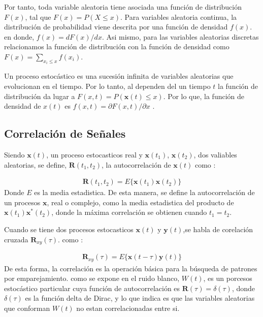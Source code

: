 Por tanto, toda variable aleatoria tiene asociada una función de distribución
${F(x)}$, tal que ${F(x)=P(X \leq x)}$. Para variables aleatoria continua, la
distribución de probabilidad viene descrita por una función de densidad
${f(x)}$. en donde, ${f(x)= dF(x)/dx}$. Asi mismo,  para las variables
aleatorias discretas relacionamos la función de distribución con la función de
densidad como ${F(x)= \displaystyle\sum_{x_i \leq x }f(x_i)}$.

Un proceso estocástico es una sucesión infinita de variables aleatorias que
evolucionan en el tiempo. Por lo tanto, al dependen del un tiempo $t$  la
función de distribución da lugar a ${F(x,t)=P(\mathbf{x}(t) \leq x)}$.
Por lo que, la función de densidad de $x(t)$ es $f(x,t)=
\partial{F(x,t)}/\partial{x}$ \cite{Papoulis91}.



\subsection{Correlación de Señales}\label{subs:corresignal}
Siendo $\mathbf{x}(t)$, un proceso estocasticos real y $\mathbf{x}(t_1)$,
$\mathbf{x}(t_2)$, dos valiables aleatorias, se define, $\mathbf{R}(t_1,t_2)$,
la autocorrelación de $\mathbf{x}(t)$ como \cite{Papoulis91}:

\begin{eqnarray}\label{eq:autocorrelation}
	\mathbf{R}(t_1,t_2)=E{\{ \mathbf{x}(t_1)\mathbf{x}(t_2) \}}
\end{eqnarray}
Donde $E$ es la media estadistica. De esta manera, se define la autocorrelación
de un procesos $\mathbf{x}$, real o complejo, como la media estadistica del
producto de $\mathbf{x}(t_1)\mathbf{x}^*(t_2)$, donde la máxima correlación se
obtienen cuando $t_1=t_2$.

Cuando se tiene dos procesos estocasticos $\mathbf{x}(t)$ y
$\mathbf{y}(t)$,se habla de corelación cruzada $\mathbf{R}_{xy}(\tau)$. como
\cite{Requena08}:

\begin{eqnarray}\label{eq:correlation}
	\mathbf{R}_{xy}(\tau)=E{\{ \mathbf{x}(t-\tau)\mathbf{y}(t) \}}
\end{eqnarray}
De esta forma, la correlación es la operación básica para la búsqueda de
patrones por emparejamiento. como se expone en \cite{Requena08} el ruido blanco,
$W(t)$, es un porcesos estocástico particular cuya función de autocorrelación es
$\mathbf{R}(\tau)= \delta(\tau)$, donde $\delta(\tau)$ es la función delta de
Dirac, y lo que indica es que las variables aleatorias que conforman $W(t)$
no estan correlacionadas entre si.


